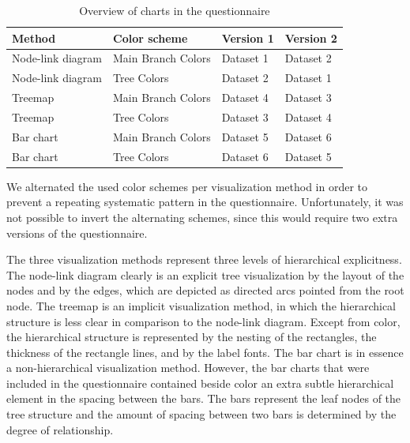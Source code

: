 \documentclass[review,journal]{vgtc}         %
\begin{document}
\begin{table}[!htb]
\begin{footnotesize}
\begin{center}
\begin{tabular}{llll}
\toprule
Method & Color scheme & Version 1 & Version 2\\
\midrule
Node-link diagram & Main Branch Colors & Dataset 1 & Dataset 2\\
Node-link diagram & Tree Colors & Dataset 2 & Dataset 1\\
Treemap & Main Branch Colors & Dataset 4 & Dataset 3\\
Treemap & Tree Colors & Dataset 3 & Dataset 4\\
Bar chart & Main Branch Colors & Dataset 5 & Dataset 6\\
Bar chart & Tree Colors & Dataset 6 & Dataset 5\\
\bottomrule
\end{tabular}
\end{center}
\end{footnotesize}
\caption{Overview of charts in the questionnaire}\label{table:ques}
\end{table}

We alternated the used color schemes per visualization method in order to prevent a repeating systematic pattern in the questionnaire. Unfortunately, it was not possible to invert the alternating schemes, since this would require two extra versions of the questionnaire. 

The three visualization methods represent three levels of hierarchical explicitness. The node-link diagram clearly is an explicit tree visualization by the layout of the nodes and by the edges, which are depicted as directed arcs pointed from the root node. The treemap is an implicit visualization method, in which the hierarchical structure is less clear in comparison to the node-link diagram. Except from color, the hierarchical structure is represented by the nesting of the rectangles, the thickness of the rectangle lines, and by the label fonts. The bar chart is in essence a non-hierarchical visualization method. However, the bar charts that were included in the questionnaire contained beside color an extra subtle hierarchical element in the spacing between the bars. The bars represent the leaf nodes of the tree structure and the amount of spacing between two bars is determined by the degree of relationship.
\end{document}
